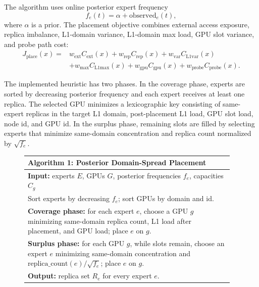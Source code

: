 \documentclass[10pt,conference]{IEEEtran}
\begin{document}
The algorithm uses online posterior expert frequency
\begin{equation}
f_e(t) = \alpha + \mathrm{observed}_e(t),
\end{equation}
where $\alpha$ is a prior. The placement objective combines external access exposure, replica imbalance, L1-domain variance, L1-domain max load, GPU slot variance, and probe path cost:
\begin{equation}
\begin{split}
J_{\mathrm{place}}(x) ={}&
w_{\mathrm{ext}} C_{\mathrm{ext}}(x)
+ w_{\mathrm{rep}} C_{\mathrm{rep}}(x)
+ w_{\mathrm{var}} C_{\mathrm{L1var}}(x)\\
&+ w_{\mathrm{max}} C_{\mathrm{L1max}}(x)
+ w_{\mathrm{gpu}} C_{\mathrm{gpu}}(x)
+ w_{\mathrm{probe}} C_{\mathrm{probe}}(x).
\end{split}
\end{equation}

The implemented heuristic has two phases. In the coverage phase, experts are sorted by decreasing posterior frequency and each expert receives at least one replica. The selected GPU minimizes a lexicographic key consisting of same-expert replicas in the target L1 domain, post-placement L1 load, GPU slot load, node id, and GPU id. In the surplus phase, remaining slots are filled by selecting experts that minimize same-domain concentration and replica count normalized by $\sqrt{f_e}$.

\begin{figure}[t]
\small
\begin{tabular}{p{0.96\linewidth}}
\toprule
\textbf{Algorithm 1: Posterior Domain-Spread Placement}\\
\midrule
\textbf{Input:} experts $E$, GPUs $G$, posterior frequencies $f_e$, capacities $C_g$\\
Sort experts by decreasing $f_e$; sort GPUs by domain and id.\\
\textbf{Coverage phase:} for each expert $e$, choose a GPU $g$ minimizing same-domain replica count, L1 load after placement, and GPU load; place $e$ on $g$.\\
\textbf{Surplus phase:} for each GPU $g$, while slots remain, choose an expert $e$ minimizing same-domain concentration and $\mathrm{replica\_count}(e)/\sqrt{f_e}$; place $e$ on $g$.\\
\textbf{Output:} replica set $R_e$ for every expert $e$.\\
\bottomrule
\end{tabular}
\end{figure}
\end{document}
